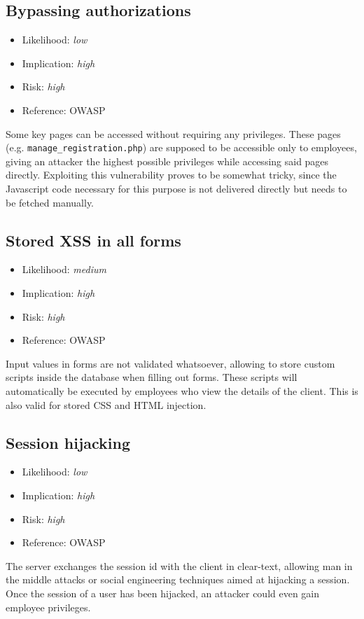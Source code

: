 \subsection{Bypassing authorizations} \label{over:authorizations}
\begin{itemize}
	\item Likelihood: \textit{low}
	\item Implication: \textit{high}
	\item Risk: \textit{high}
	\item Reference: OWASP 
\end{itemize}
Some key pages can be accessed without requiring any privileges. These pages (e.g. \texttt{manage\_registration.php}) are supposed to be accessible only to employees, giving an attacker the highest possible privileges while accessing said pages directly. Exploiting this vulnerability proves to be somewhat tricky, since the Javascript code necessary for this purpose is not delivered directly but needs to be fetched manually.

\subsection{Stored XSS in all forms} \label{over:gnb_xss}
\begin{itemize}
	\item Likelihood: \textit{medium}
	\item Implication: \textit{high}
	\item Risk: \textit{high}
	\item Reference: OWASP 
\end{itemize}
Input values in forms are not validated whatsoever, allowing to store custom scripts inside the database when filling out forms. These scripts will automatically be executed by employees who view the details of the client. This is also valid for stored CSS and HTML injection.

\subsection{Session hijacking} \label{over:gnb_session}
\begin{itemize}
	\item Likelihood: \textit{low}
	\item Implication: \textit{high}
	\item Risk: \textit{high}
	\item Reference: OWASP 
\end{itemize}
The server exchanges the session id with the client in clear-text, allowing man in the middle attacks or social engineering techniques aimed at hijacking a session. Once the session of a user has been hijacked, an attacker could even gain employee privileges.

